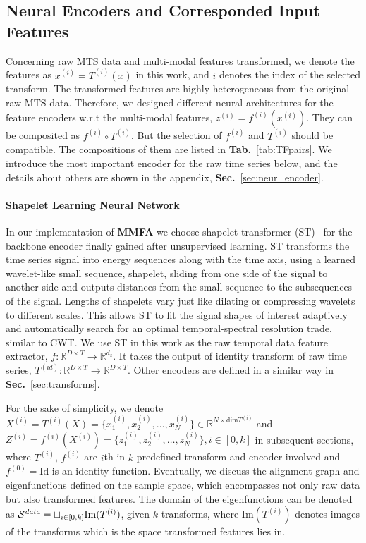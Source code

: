 \documentclass{article}
\begin{document}
\subsection{Neural Encoders and Corresponded Input Features}\label{sec:neur_encoder_main}

Concerning raw MTS data and multi-modal features transformed, we denote the features as $x^{(i)} = T^{(i)}(x)$ in this work, and $i$ denotes the index of the selected transform. The transformed features are highly heterogeneous from the original raw MTS data. Therefore, we designed different neural architectures for the feature encoders w.r.t the multi-modal features, $z^{(i)} = f^{(i)}(x^{(i)})$. They can be composited as $f^{(i)} \circ T^{(i)}$. But the selection of $f^{(i)}$ and $T^{(i)}$ should be compatible. The compositions of them are listed in \textbf{Tab.}~\ref{tab:TFpairs}. We introduce the most important encoder for the raw time series below, and the details about others are shown in the appendix, \textbf{Sec.}~\ref{sec:neur_encoder}.

\paragraph{Shapelet Learning Neural Network}

In our implementation of \textbf{MMFA} we choose shapelet transformer (ST)~\cite{liang2023contrastive} for the backbone encoder finally gained after unsupervised learning. ST transforms the time series signal into energy sequences along with the time axis, using a learned wavelet-like small sequence, shapelet, sliding from one side of the signal to another side and outputs distances from the small sequence to the subsequences of the signal. Lengths of shapelets vary just like dilating or compressing wavelets to different scales. This allows ST to fit the signal shapes of interest adaptively and automatically search for an optimal temporal-spectral resolution trade, similar to CWT. We use ST in this work as the raw temporal data feature extractor, $f: \mathbb{R}^{D \times T} \to \mathbb{R}^{d_z}$. It takes the output of identity transform of raw time series, $T^{(id)}: \mathbb{R}^{D\times T} \to \mathbb{R}^{D \times T}$. Other encoders are defined in a similar way in \textbf{Sec.}~\ref{sec:transforms}.

For the sake of simplicity, we denote \( X^{(i)} = T^{(i)}(X)  = \{ x_1^{(i)}, x_2^{(i)}, \dots , x_N^{(i)} \} \in \mathbb{R}^{N \times \text{dim} T^{(i)}} \) and $ Z^{(i)} = f^{(i)}(X^{(i)}) =  \{ z^{(i)}_1, z^{(i)}_2, \dots , z^{(i)}_N\}, i \in [0,k]$ in subsequent sections, where $T^{(i)}$, $f^{(i)}$ are $i$th in $k$ predefined transform and encoder involved and $f^{(0)} = \text{Id}$ is an identity function. Eventually, we discuss the alignment graph and eigenfunctions defined on the sample space, which encompasses not only raw data but also transformed features. The domain of the eigenfunctions can be denoted as \( \mathcal{S}^{\text{\textit{data}}} = \sqcup_{i \in [0,k]} \text{Im}(T^{(i)}) \), given $k$ transforms, where $\text{Im}(T^{(i)})$ denotes images of the transforms which is the space transformed features lies in.
\end{document}
